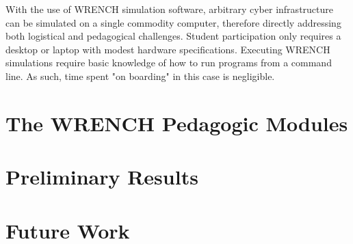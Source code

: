 \documentclass{article}
\begin{document}
With the use of WRENCH simulation software, arbitrary cyber infrastructure can be simulated
on a single commodity computer, therefore directly addressing both logistical and 
pedagogical challenges. Student participation only requires a desktop or laptop with modest
hardware specifications. Executing WRENCH simulations require basic knowledge of how to
run programs from a command line. As such, time spent "on boarding" in this case is
negligible. 

\section{The WRENCH Pedagogic Modules}

\section{Preliminary Results}

\section{Future Work}



\end{document}
